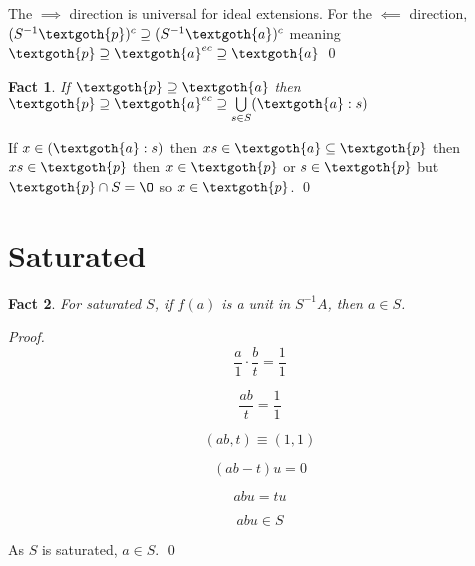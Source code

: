 \documentclass{article}
\newtheorem{theorem}{Fact}[section]
\begin{document}
\noindent
The $\implies$ direction is universal for ideal extensions. For the $\impliedby$ direction, 
$(S^{-1}\textgoth{p})^c \supseteq (S^{-1}\textgoth{a})^c$ meaning $\textgoth{p} \supseteq \textgoth{a}^{ec} \supseteq \textgoth{a}$
\qed

\vspace{1.5em}
\begin{theorem}
If $\textgoth{p} \supseteq \textgoth{a}$ then $\textgoth{p} \supseteq \textgoth{a}^{ec} \supseteq \bigcup\limits_{s \in S} (\textgoth{a}:s)$
\end{theorem}

\noindent
If $x \in (\textgoth{a}:s)$ then $xs \in \textgoth{a} \subseteq \textgoth{p}$ then $xs \in \textgoth{p}$ then $x \in \textgoth{p}$ or $s \in \textgoth{p}$ but $\textgoth{p} \cap S = \O$ so $x \in \textgoth{p}$. 
\qed

\section{Saturated}

\begin{theorem}
For saturated $S$, if $f(a)$ is a unit in $S^{-1}A$, then $a \in S$.
\end{theorem}

\noindent
\textit{Proof.}
\[
  \frac{a}{1} \cdot \frac{b}{t} = \frac{1}{1} 
\]

\[
  \frac{ab}{t} = \frac{1}{1}
\]

\[
   (ab, t) \equiv (1, 1)
\]
 
\[
   (ab - t)u = 0
\]

\[
   abu = tu
\]

\[
   abu \in S
\]

As \( S \) is saturated, \( a \in S \).  \qed
\end{document}
